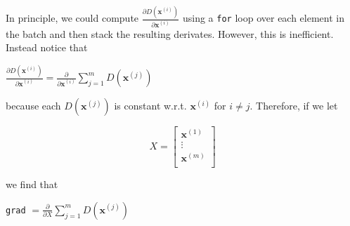 \begin{enumerate}[label=(\alph*)]
    In principle, we could compute $\frac{\partial D(\bm{x}^{(i)})}{\partial \bm{x}^{(i)}}$ using a \texttt{for} loop 
    over each element in the batch and then stack the resulting derivates. However, this is inefficient. Instead notice that

    \begin{center}
        $\frac{\partial D(\bm{x}^{(i)})}{\partial \bm{x}^{(i)}} = \frac{\partial}{\partial \bm{x}^{(i)}} \sum\limits_{j=1}^{m} D(\bm{x}^{(j)})$
    \end{center}

    because each $D(\bm{x}^{(j)})$ is constant w.r.t. $\bm{x}^{(i)}$ for $i \ne j$. Therefore, if we let

    \begin{center}
        \[
            X = 
            \begin{bmatrix}
                \bm{x}^{(1)} \\
                \vdots \\
                \bm{x}^{(m)} \\
            \end{bmatrix}
        \]
    \end{center}

    we find that

    \begin{center}
        \texttt{grad} $ = \frac{\partial}{\partial X} \sum\limits_{j=1}^{m} D(\bm{x}^{(j)})$
    \end{center}
    
\end{enumerate}
